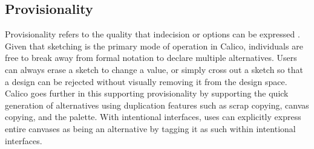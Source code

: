 


\subsection{Provisionality}
Provisionality refers to the quality that indecision or options can be expressed \cite{Petre2013BookChapter}. Given that sketching is the primary mode of operation in Calico, individuals are free to break away from formal notation to declare multiple alternatives. Users can always erase a sketch to change a value, or simply cross out a sketch so that a design can be rejected without visually removing it from the design space. Calico goes further in this supporting provisionality by supporting the quick generation of alternatives using duplication features such as scrap copying, canvas copying, and the palette. With intentional interfaces, uses can explicitly express entire canvases as being an alternative by tagging it as such within intentional interfaces.

